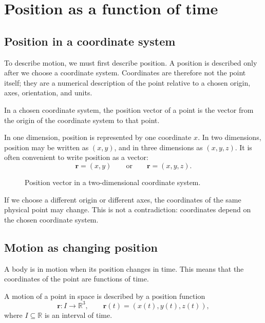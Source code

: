\section{Position as a function of time}

\subsection{Position in a coordinate system}

To describe motion, we must first describe position. A position is described only after we choose a coordinate system. Coordinates are therefore not the point itself; they are a numerical description of the point relative to a chosen origin, axes, orientation, and units.

\begin{definitionbox}
In a chosen coordinate system, the position vector of a point is the vector from the origin of the coordinate system to that point.
\end{definitionbox}

In one dimension, position is represented by one coordinate \(x\). In two dimensions, position may be written as \((x,y)\), and in three dimensions as \((x,y,z)\). It is often convenient to write position as a vector:
\[
\mathbf{r}=(x,y)
\qquad\text{or}\qquad
\mathbf{r}=(x,y,z).
\]

\begin{figure}[htbp]
\centering

\caption{Position vector in a two-dimensional coordinate system.}
\label{fig:kinematics-position-vector}
\end{figure}

\begin{remarkbox}
If we choose a different origin or different axes, the coordinates of the same physical point may change. This is not a contradiction: coordinates depend on the chosen coordinate system.
\end{remarkbox}

\subsection{Motion as changing position}

A body is in motion when its position changes in time. This means that the coordinates of the point are functions of time.

\begin{definitionbox}
A motion of a point in space is described by a position function
\[
\mathbf{r}\colon I\to\mathbb{R}^3,
\qquad
\mathbf{r}(t)=(x(t),y(t),z(t)),
\]
where \(I\subseteq\mathbb{R}\) is an interval of time.
\end{definitionbox}


